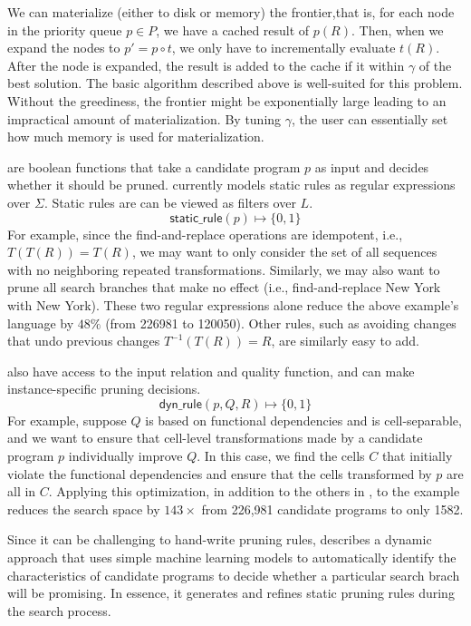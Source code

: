  We can materialize (either to disk or memory) the frontier,that is, for each node in the priority queue $p \in P$, we have a cached result of $p(R)$. 
 Then, when we expand the nodes to $p' = p \circ t$, we only have to incrementally evaluate $t(R)$.
 After the node is expanded, the result is added to the cache if it within $\gamma$ of the best solution.
 The basic algorithm described above is well-suited for this problem.
 Without the greediness, the frontier might be exponentially large leading to an impractical amount of materialization.
 By tuning $\gamma$, the user can essentially set how much memory is used for materialization.


 are boolean functions that take a candidate program $p$ as input and decides whether it should be pruned. \sys currently models static rules as regular expressions over $\Sigma$.  Static rules are can be viewed as filters over $L$.
\[\textsf{static\_rule}(p) \mapsto \{0,1\}\]
For example, since the find-and-replace operations are idempotent, i.e., $T(T(R)) = T(R)$, we may want to only consider the set of all sequences with no neighboring repeated transformations. Similarly, we may also want to prune all search branches that make no effect (i.e., find-and-replace New York with New York).
These two regular expressions alone reduce the above example's language by $48\%$ (from 226981 to 120050).
Other rules, such as avoiding changes that undo previous changes $T^{-1}(T(R)) = R$, are similarly easy to add.


 also have access to the input relation and quality function, and can make instance-specific pruning decisions.
\[\textsf{dyn\_rule}(p, Q, R) \mapsto \{0,1\}\]
For example, suppose  $Q$ is based on functional dependencies and is cell-separable, and we want to ensure that cell-level transformations made by a candidate program $p$ individually improve $Q$.  In this case, we find the cells $C$ that initially violate the functional dependencies and ensure that the cells transformed by $p$ are all in $C$.  Applying this optimization, in addition to the others in \sys, to the example reduces the search space by $143\times$ from 226,981 candidate programs to only 1582.  

Since it can be challenging to hand-write pruning rules,  describes a dynamic approach that uses simple machine learning models to automatically identify the characteristics of candidate programs to decide whether a particular search brach will be promising.  In essence, it generates and refines static pruning rules during the search process.  

